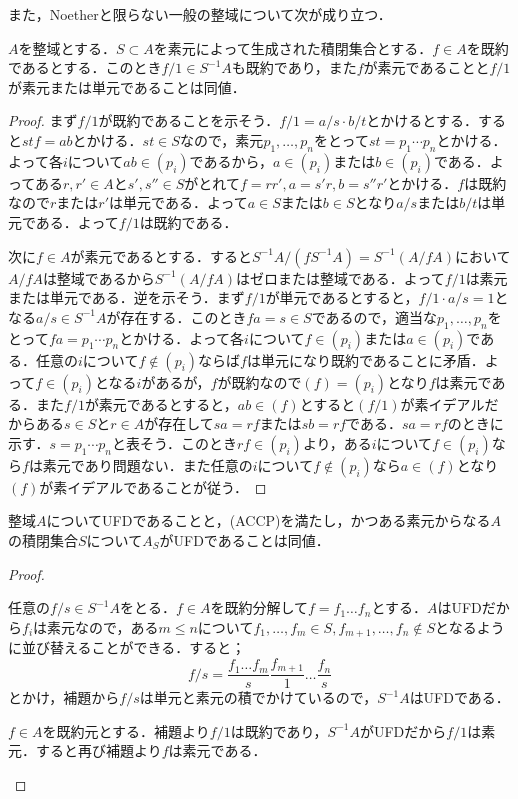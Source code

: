 また，Noetherと限らない一般の整域について次が成り立つ．

\begin{lem}
	$A$を整域とする．$S\subset A$を素元によって生成された積閉集合とする．$f\in A$を既約であるとする．このとき$f/1\in S^{-1}A$も既約であり，また$f$が素元であることと$f/1$が素元または単元であることは同値．
\end{lem}

\begin{proof}
	まず$f/1$が既約であることを示そう．$f/1=a/s\cdot b/t$とかけるとする．すると$stf=ab$とかける．$st\in S$なので，素元$p_1,\dots,p_n$をとって$st=p_1\cdots p_n$とかける．よって各$i$について$ab\in (p_i)$であるから，$a\in (p_i)$または$b\in (p_i)$である．よってある$r,r'\in A$と$s',s''\in S$がとれて$f=rr',a=s'r,b=s''r'$とかける．$f$は既約なので$r$または$r'$は単元である．よって$a\in S$または$b\in S$となり$a/s$または$b/t$は単元である．よって$f/1$は既約である．
	
	次に$f\in A$が素元であるとする．すると$S^{-1}A/(fS^{-1}A)=S^{-1}(A/fA)$において$A/fA$は整域であるから$S^{-1}(A/fA)$はゼロまたは整域である．よって$f/1$は素元または単元である．逆を示そう．まず$f/1$が単元であるとすると，$f/1\cdot a/s=1$となる$a/s\in S^{-1}A$が存在する．このとき$fa=s\in S$であるので，適当な$p_1,\dots,p_n$をとって$fa=p_1\cdots p_n$とかける．よって各$i$について$f\in (p_i)$または$a\in (p_i)$である．任意の$i$について$f\not\in (p_i)$ならば$f$は単元になり既約であることに矛盾．よって$f\in (p_i)$となる$i$があるが，$f$が既約なので$(f)=(p_i)$となり$f$は素元である．また$f/1$が素元であるとすると，$ab\in (f)$とすると$(f/1)$が素イデアルだからある$s\in S$と$r\in A$が存在して$sa=rf$または$sb=rf$である．$sa=rf$のときに示す．$s=p_1\cdots p_n$と表そう．このとき$rf\in (p_i)$より，ある$i$について$f\in (p_i)$なら$f$は素元であり問題ない．また任意の$i$について$f\not\in (p_i)$なら$a\in (f)$となり$(f)$が素イデアルであることが従う．
\end{proof}

\begin{thm}[永田の判定条件]\label{thm:UFDnagata}
	整域$A$についてUFDであることと，(ACCP)を満たし，かつある素元からなる$A$の積閉集合$S$について$A_S$がUFDであることは同値．
\end{thm}

\begin{proof}
	\begin{eqv}
		\item 任意の$f/s\in S^{-1}A$をとる．$f\in A$を既約分解して$f=f_1\dots f_n$とする．$A$はUFDだから$f_i$は素元なので，ある$m\leq n$について$f_1,\dots,f_m\in S,f_{m+1},\dots,f_n\not\in S$となるように並び替えることができる．すると；
		\[f/s=\frac{f_1\dots f_m}{s}\frac{f_{m+1}}{1}\dots\frac{f_n}{s}\]
		とかけ，補題から$f/s$は単元と素元の積でかけているので，$S^{-1}A$はUFDである．
		\item $f\in A$を既約元とする．補題より$f/1$は既約であり，$S^{-1}A$がUFDだから$f/1$は素元．すると再び補題より$f$は素元である．
	\end{eqv}
\end{proof}

